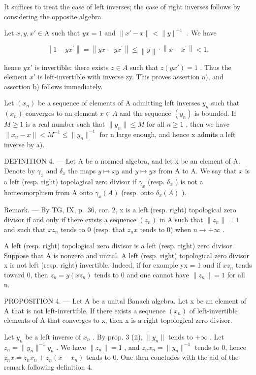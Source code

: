 It suffices to treat the case of left inverses; the case of right inverses follows by considering the opposite algebra.

Let \(x, y, x' \in \mathrm{A}\) such that \(yx = 1\) and \(\|x' - x\| < \|y\|^{-1}\) . We have

\[
\left\| 1 - y x ^ {\prime} \right\| = \left\| y x - y x ^ {\prime} \right\| \leqslant \left\| y \right\| \cdot \left\| x - x ^ {\prime} \right\| <   1,
\]

hence \(yx'\) is invertible: there exists \(z \in A\) such that \(z(yx') = 1\) . Thus the element \(x'\) is left-invertible with inverse zy. This proves assertion a), and assertion b) follows immediately.

  Let \((x_{n})\) be a sequence of elements of A admitting left inverses \(y_{n}\) such that \((x_{n})\) converges to an element \(x \in A\) and the sequence \((y_{n})\) is bounded. If \(M \geqslant 1\) is a real number such that \(\|y_{n}\| \leqslant M\) for all \(n \geqslant 1\) , then we have \(\|x_{n} - x\| < M^{-1} \leqslant \|y_{n}\|^{-1}\) for n large enough, and hence x admits a left inverse by a).

DEFINITION 4. --- Let A be a normed algebra, and let x be an element of A. Denote by \(\gamma_x\) and \(\delta_x\) the maps \(y \mapsto xy\) and \(y \mapsto yx\) from A to A. We say that \(x\) is a left (resp. right) topological zero divisor if \(\gamma_x\) (resp. \(\delta_x\) ) is not a homeomorphism from A onto \(\gamma_x(A)\) (resp. onto \(\delta_x(A)\) ).

Remark. --- By TG, IX, p.~36, cor. 2, x is a left (resp. right) topological zero divisor if and only if there exists a sequence \((z_{n})\) in A such that \(\|z_{n}\|=1\) and such that \(xz_{n}\) tends to 0 (resp. that \(z_{n}x\) tends to 0) when \(n\to+\infty\) .

A left (resp. right) topological zero divisor is a left (resp. right) zero divisor. Suppose that A is nonzero and unital. A left (resp. right) topological zero divisor x is not left (resp. right) invertible. Indeed, if for example yx = 1 and if \(xz_{n}\) tends toward 0, then \(z_{n} = y(xz_{n})\) tends to 0 and one cannot have \(\|z_{n}\| = 1\) for all n.

PROPOSITION 4. --- Let A be a unital Banach algebra. Let x be an element of A that is not left-invertible. If there exists a sequence \((x_{n})\) of left-invertible elements of A that converges to x, then x is a right topological zero divisor.

Let \(y_{n}\) be a left inverse of \(x_{n}\) . By prop. 3 (ii), \(\|y_{n}\|\) tends to \(+\infty\) . Let \(z_{n} = \|y_{n}\|^{-1}y_{n}\) . We have \(\|z_{n}\| = 1\) , and \(z_{n}x_{n} = \|y_{n}\|^{-1}\) tends to 0, hence \(z_{n}x = z_{n}x_{n} + z_{n}(x - x_{n})\) tends to 0. One then concludes with the aid of the remark following definition 4.

